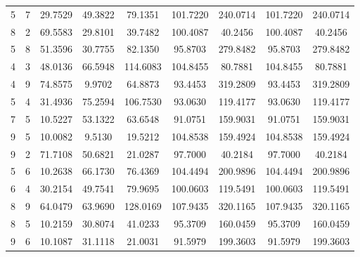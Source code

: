 \documentclass[withoutpreface,bwprint]{cumcmthesis} %
\begin{document}
\begin{appendices}
\begin{table}[htbp!]
\begin{tabular}{@{}ccccccccc@{}}
								5              & 7              & 29.7529     & 49.3822     & 79.1351     & 101.7220        & 240.0714        & 101.7220        & 240.0714        \\
								8              & 2              & 69.5583     & 29.8101     & 39.7482     & 100.4087        & 40.2456         & 100.4087        & 40.2456         \\
								5              & 8              & 51.3596     & 30.7755     & 82.1350     & 95.8703         & 279.8482        & 95.8703         & 279.8482        \\
								4              & 3              & 48.0136     & 66.5948     & 114.6083    & 104.8455        & 80.7881         & 104.8455        & 80.7881         \\
								4              & 9              & 74.8575     & 9.9702      & 64.8873     & 93.4453         & 319.2809        & 93.4453         & 319.2809        \\
								5              & 4              & 31.4936     & 75.2594     & 106.7530    & 93.0630         & 119.4177        & 93.0630         & 119.4177        \\
								7              & 5              & 10.5227     & 53.1322     & 63.6548     & 91.0751         & 159.9031        & 91.0751         & 159.9031        \\
								9              & 5              & 10.0082     & 9.5130      & 19.5212     & 104.8538        & 159.4924        & 104.8538        & 159.4924        \\
								9              & 2              & 71.7108     & 50.6821     & 21.0287     & 97.7000         & 40.2184         & 97.7000         & 40.2184         \\
								5              & 6              & 10.2638     & 66.1730     & 76.4369     & 104.4494        & 200.9896        & 104.4494        & 200.9896        \\
								6              & 4              & 30.2154     & 49.7541     & 79.9695     & 100.0603        & 119.5491        & 100.0603        & 119.5491        \\
								8              & 9              & 64.0479     & 63.9690     & 128.0169    & 107.9435        & 320.1165        & 107.9435        & 320.1165        \\
								8              & 5              & 10.2159     & 30.8074     & 41.0233     & 95.3709         & 160.0459        & 95.3709         & 160.0459        \\
								9              & 6              & 10.1087     & 31.1118     & 21.0031     & 91.5979         & 199.3603        & 91.5979         & 199.3603        \\

\end{tabular}
\end{table}
\end{appendices}
\end{document}
